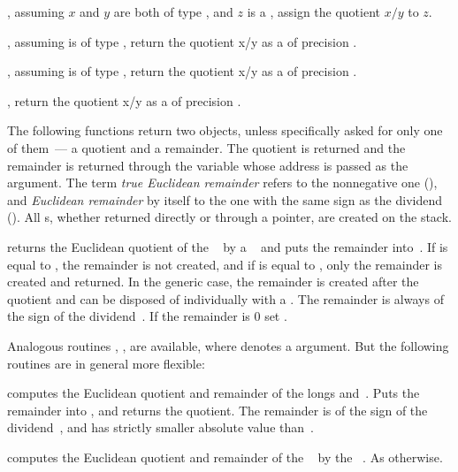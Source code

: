 , assuming $x$ and $y$
are both of type , and $z$ is a ,
assign the quotient $x/y$ to $z$.

, assuming 
is of type , return the quotient x/y as a  of
precision .

, assuming 
is of type , return the quotient x/y as a  of
precision .

, return the quotient x/y as a
 of precision .


 The following functions return two objects,
unless specifically asked for only one of them~--- a quotient and a remainder.
The quotient is returned and the remainder is returned through the variable
whose address is passed as the  argument. The term \emph{true
Euclidean remainder} refers to the nonnegative one (), and
\emph{Euclidean remainder} by itself to the one with the same sign as the
dividend (). All s, whether returned directly or through a
pointer, are created on the stack.

 returns the Euclidean quotient of the
~ by a ~ and puts the remainder
into~. If  is equal to , the remainder is not
created, and if  is equal to  , only the remainder is
created and returned. In the generic case, the remainder is created after the
quotient and can be disposed of individually with a . The
remainder is always of the sign of the dividend~. If the remainder
is $0$ set .

\noindent Analogous routines , ,
 are available, where  denotes a 
argument. But the following routines are in general more flexible:

 computes the Euclidean
quotient and remainder of the longs  and~. Puts the remainder
into , and returns the quotient. The remainder is of the sign of the
dividend~, and has strictly smaller absolute value than~.

 computes the Euclidean
quotient and remainder of the ~ by the ~. As
 otherwise.

